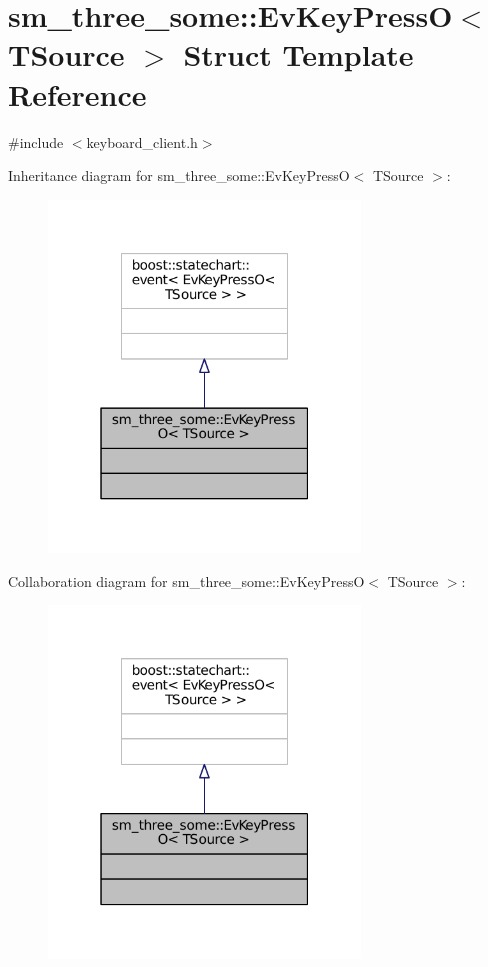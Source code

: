 \hypertarget{structsm__three__some_1_1EvKeyPressO}{}\section{sm\+\_\+three\+\_\+some\+:\+:Ev\+Key\+PressO$<$ T\+Source $>$ Struct Template Reference}
\label{structsm__three__some_1_1EvKeyPressO}


{\ttfamily \#include $<$keyboard\+\_\+client.\+h$>$}



Inheritance diagram for sm\+\_\+three\+\_\+some\+:\+:Ev\+Key\+PressO$<$ T\+Source $>$\+:
\nopagebreak
\begin{figure}[H]
\begin{center}
\leavevmode
\includegraphics[width=235pt]{structsm__three__some_1_1EvKeyPressO__inherit__graph}
\end{center}
\end{figure}


Collaboration diagram for sm\+\_\+three\+\_\+some\+:\+:Ev\+Key\+PressO$<$ T\+Source $>$\+:
\nopagebreak
\begin{figure}[H]
\begin{center}
\leavevmode
\includegraphics[width=235pt]{structsm__three__some_1_1EvKeyPressO__coll__graph}
\end{center}
\end{figure}


